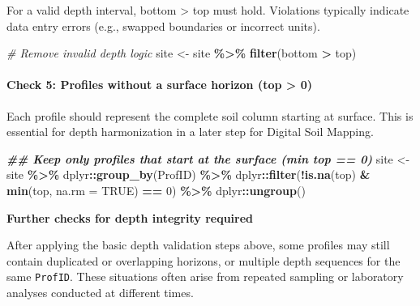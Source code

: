 \documentclass[
  10pt,
  b5paper,
  oneside]{book}
\newenvironment{Shaded}{\begin{snugshade}}{\end{snugshade}}
\newcommand{\AttributeTok}[1]{\textcolor[rgb]{0.13,0.29,0.53}{#1}}
\newcommand{\CommentTok}[1]{\textcolor[rgb]{0.56,0.35,0.01}{\textit{#1}}}
\newcommand{\ConstantTok}[1]{\textcolor[rgb]{0.56,0.35,0.01}{#1}}
\newcommand{\DecValTok}[1]{\textcolor[rgb]{0.00,0.00,0.81}{#1}}
\newcommand{\DocumentationTok}[1]{\textcolor[rgb]{0.56,0.35,0.01}{\textbf{\textit{#1}}}}
\newcommand{\FunctionTok}[1]{\textcolor[rgb]{0.13,0.29,0.53}{\textbf{#1}}}
\newcommand{\NormalTok}[1]{#1}
\newcommand{\OtherTok}[1]{\textcolor[rgb]{0.56,0.35,0.01}{#1}}
\newcommand{\SpecialCharTok}[1]{\textcolor[rgb]{0.81,0.36,0.00}{\textbf{#1}}}
\begin{document}
For a valid depth interval, bottom \textgreater{} top must hold. Violations typically indicate data entry errors (e.g., swapped boundaries or incorrect units).

\begin{Shaded}
\begin{Highlighting}[]
\CommentTok{\# Remove invalid depth logic}
\NormalTok{site }\OtherTok{\textless{}{-}}\NormalTok{ site }\SpecialCharTok{\%\textgreater{}\%}
  \FunctionTok{filter}\NormalTok{(bottom }\SpecialCharTok{\textgreater{}}\NormalTok{ top)}
\end{Highlighting}
\end{Shaded}

\paragraph*{Check 5: Profiles without a surface horizon (top \textgreater{} 0)}\label{check-5-profiles-without-a-surface-horizon-top-0}

Each profile should represent the complete soil column starting at surface. This is essential for depth harmonization in a later step for Digital Soil Mapping.

\begin{Shaded}
\begin{Highlighting}[]
\DocumentationTok{\#\# Keep only profiles that start at the surface (min top == 0)}
\NormalTok{site }\OtherTok{\textless{}{-}}\NormalTok{ site }\SpecialCharTok{\%\textgreater{}\%}
\NormalTok{  dplyr}\SpecialCharTok{::}\FunctionTok{group\_by}\NormalTok{(ProfID) }\SpecialCharTok{\%\textgreater{}\%}
\NormalTok{  dplyr}\SpecialCharTok{::}\FunctionTok{filter}\NormalTok{(}\SpecialCharTok{!}\FunctionTok{is.na}\NormalTok{(top) }\SpecialCharTok{\&} \FunctionTok{min}\NormalTok{(top, }\AttributeTok{na.rm =} \ConstantTok{TRUE}\NormalTok{) }\SpecialCharTok{==} \DecValTok{0}\NormalTok{) }\SpecialCharTok{\%\textgreater{}\%}
\NormalTok{  dplyr}\SpecialCharTok{::}\FunctionTok{ungroup}\NormalTok{()}
\end{Highlighting}
\end{Shaded}

\textbf{Further checks for depth integrity required}

After applying the basic depth validation steps above, some profiles may still contain duplicated or overlapping horizons, or multiple depth sequences for the same \texttt{ProfID}. These situations often arise from repeated sampling or laboratory analyses conducted at different times.
\end{document}
